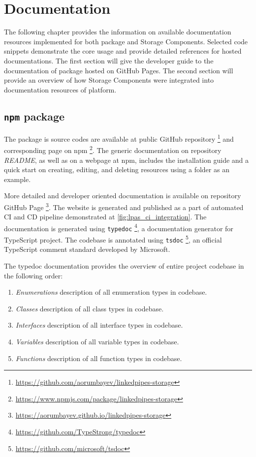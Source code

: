 \chapter{Documentation}
\label{chap:num_8}

The following chapter provides the information on available documentation resources implemented for both \lpas{} package and \lpa{} Storage Components. Selected code snippets demonstrate the core usage and provide detailed references for hosted documentations. The first section will give the developer guide to the documentation of \lpa{} package hosted on GitHub Pages. The second section will provide an overview of how \lpa{} Storage Components were integrated into documentation resources of \lpa{} platform.

\section{\texttt{npm} package}

The package is source codes are available at public GitHub repository \footnote{\url{https://github.com/aorumbayev/linkedpipes-storage}} and corresponding page on npm \footnote{\url{https://www.npmjs.com/package/linkedpipes-storage}}. The generic documentation on repository \textit{README}, as well as on a webpage at npm, includes the installation guide and a quick start on creating, editing, and deleting resources using a folder as an example. 

More detailed and developer oriented documentation is available on repository GitHub Page \footnote{\url{https://aorumbayev.github.io/linkedpipes-storage}}. The website is generated and published as a part of automated CI and CD pipeline demonstrated at \autoref{fig:lpas_ci_integration}. The documentation is generated using \texttt{typedoc} \footnote{\url{https://github.com/TypeStrong/typedoc}}, a documentation generator for TypeScript project. The codebase is annotated using \texttt{tsdoc} \footnote{\url{https://github.com/microsoft/tsdoc}}, an official TypeScript comment standard developed by Microsoft.

The typedoc documentation provides the overview of entire \lpas{} project codebase in the following order:
\begin{enumerate}
    \item \textit{Enumerations} description of all enumeration types in codebase.
    \item \textit{Classes} description of all class types in codebase.
    \item \textit{Interfaces} description of all interface types in codebase.
    \item \textit{Variables} description of all variable types in codebase.
    \item \textit{Functions} description of all function types in codebase.
\end{enumerate}

